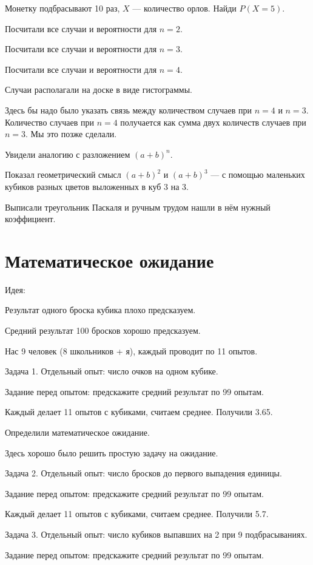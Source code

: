 \documentclass[a4paper, 12pt]{article}
\begin{document}
Монетку подбрасывают 10 раз, $X$ — количество орлов. Найди $P(X=5)$.

Посчитали все случаи и вероятности для $n=2$.

Посчитали все случаи и вероятности для $n=3$.

Посчитали все случаи и вероятности для $n=4$.

Случаи располагали на доске в виде гистограммы.

Здесь бы надо было указать связь между количеством случаев при $n=4$ и $n=3$. Количество случаев при $n=4$ получается как сумма двух количеств случаев при $n=3$. Мы это позже сделали.

Увидели аналогию с разложением $(a+b)^n$.

Показал геометрический смысл $(a+b)^2$ и $(a+b)^3$ — с помощью маленьких кубиков разных цветов выложенных в куб 3 на 3.

Выписали треугольник Паскаля и ручным трудом нашли в нём нужный коэффициент.



\section{Математическое ожидание}

Идея:

Результат одного броска кубика плохо предсказуем.

Средний результат 100 бросков хорошо предсказуем.

Нас 9 человек (8 школьников + я), каждый проводит по 11 опытов.

Задача 1. Отдельный опыт: число очков на одном кубике.

Задание перед опытом: предскажите средний результат по 99 опытам.

Каждый делает 11 опытов с кубиками, считаем среднее. Получили 3.65.

Определили математическое ожидание.

Здесь хорошо было решить простую задачу на ожидание.

Задача 2. Отдельный опыт: число бросков до первого выпадения единицы.

Задание перед опытом: предскажите средний результат по 99 опытам.

Каждый делает 11 опытов с кубиками, считаем среднее. Получили 5.7.

Задача 3. Отдельный опыт: число кубиков выпавших на 2 при 9 подбрасываниях.

Задание перед опытом: предскажите средний результат по 99 опытам.
\end{document}
